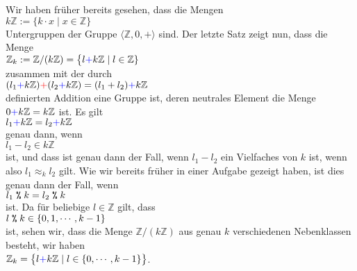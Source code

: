 \example
Wir haben fr\"{u}her bereits gesehen, dass die Mengen 
\\[0.2cm]
\hspace*{1.3cm}
$k\mathbb{Z} := \bigr\{ k \cdot x \mid x \in \mathbb{Z} \bigr\}$
\\[0.2cm]
Untergruppen der Gruppe $\langle \mathbb{Z}, 0, + \rangle$ sind.  Der letzte Satz zeigt nun, dass die Menge
\\[0.2cm]
\hspace*{1.3cm}
$\mathbb{Z}_k := \mathbb{Z}/(k\mathbb{Z}) = \bigl\{ l {\color{blue}{+}} k\mathbb{Z} \mid l \in \mathbb{Z} \}$
\\[0.2cm]
zusammen mit der durch
\\[0.2cm]
\hspace*{1.3cm}
$(l_1 {\color{blue}{+}} k\mathbb{Z}) {\color{red}{+}} (l_2 {\color{blue}{+}} k\mathbb{Z}) = (l_1 + l_2) {\color{blue}{+}} k\mathbb{Z}$
\\[0.2cm]
definierten Addition eine Gruppe ist, deren neutrales Element die Menge $0 {\color{blue}{+}} k\mathbb{Z} = k\mathbb{Z}$ ist.
Es gilt
\\[0.2cm]
\hspace*{1.3cm}
$l_1 {\color{blue}{+}} k\mathbb{Z} = l_2 {\color{blue}{+}} k\mathbb{Z}$
\\[0.2cm]
genau dann, wenn
\\[0.2cm]
\hspace*{1.3cm}
$l_1 - l_2 \in k\mathbb{Z}$
\\[0.2cm]
ist, und dass ist genau dann der Fall, wenn $l_1 - l_2$ ein Vielfaches von $k$ ist, wenn also
$l_1 \approx_k l_2$ gilt.  Wie wir bereits fr\"{u}her in einer Aufgabe gezeigt haben, ist dies genau dann der Fall, wenn
\\[0.2cm]
\hspace*{1.3cm}
$l_1 \;\texttt{\%}\; k = l_2 \;\texttt{\%}\; k$
\\[0.2cm]
ist.  Da f\"ur beliebige $l \in \mathbb{Z}$ gilt, dass
\\[0.2cm]
\hspace*{1.3cm}
$l \;\texttt{\%}\; k \in \{0, 1, \cdots, k-1\}$ 
\\[0.2cm]
ist, sehen wir, dass die Menge $\mathbb{Z}/(k\mathbb{Z})$ aus genau $k$ verschiedenen Nebenklassen
besteht, wir haben
\\[0.2cm]
\hspace*{1.3cm}
$\mathbb{Z}_k = \bigl\{ l {\color{blue}{+}} k\mathbb{Z} \mid l \in \{0, \cdots, k - 1\} \bigr\}$.
\vspace*{0.2cm}

